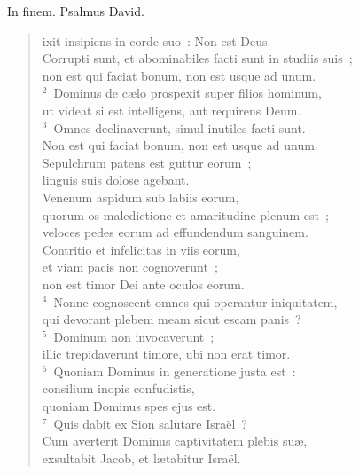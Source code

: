 \bchapter[Psalm]
In finem. Psalmus David. \begin{verse}ixit insipiens in corde suo~: Non est Deus.\\ Corrupti sunt, et abominabiles facti sunt in studiis suis~;\\ non est qui faciat bonum, non est usque ad unum.\\
${}^{2}$~Dominus de c\ae lo prospexit super filios hominum,\\ ut videat si est intelligens, aut requirens Deum.\\
${}^{3}$~Omnes declinaverunt, simul inutiles facti sunt.\\ Non est qui faciat bonum, non est usque ad unum.\\ Sepulchrum patens est guttur eorum~;\\ linguis suis dolose agebant.\\ Venenum aspidum sub labiis eorum,\\ quorum os maledictione et amaritudine plenum est~;\\ veloces pedes eorum ad effundendum sanguinem.\\ Contritio et infelicitas in viis eorum,\\ et viam pacis non cognoverunt~;\\ non est timor Dei ante oculos eorum.\\
${}^{4}$~Nonne cognoscent omnes qui operantur iniquitatem,\\ qui devorant plebem meam sicut escam panis~?\\
${}^{5}$~Dominum non invocaverunt~;\\ illic trepidaverunt timore, ubi non erat timor.\\
${}^{6}$~Quoniam Dominus in generatione justa est~:\\ consilium inopis confudistis,\\ quoniam Dominus spes ejus est.\\
${}^{7}$~Quis dabit ex Sion salutare Isra\"el~?\\ Cum averterit Dominus captivitatem plebis su\ae ,\\ exsultabit Jacob, et l\ae tabitur Isra\"el.\end{verse}



